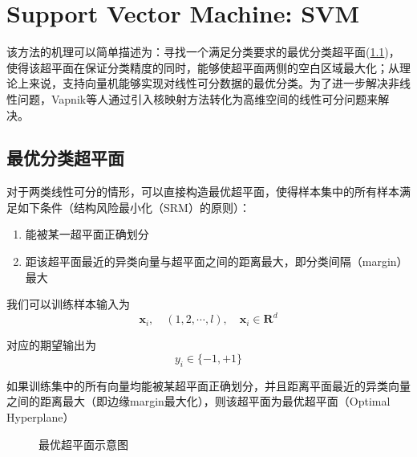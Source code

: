 \chapter{Support Vector Machine: SVM}

该方法的机理可以简单描述为：寻找一个满足分类要求的最优分类超平面(\ref{sec:optimal-classification-hyperplane})，使得该超平面在保证分类精度的同时，能够使超平面两侧的空白区域最大化；从理论上来说，支持向量机能够实现对线性可分数据的最优分类。为了进一步解决非线性问题，Vapnik等人通过引入核映射方法转化为高维空间的线性可分问题来解决。

\section{最优分类超平面}\label{sec:optimal-classification-hyperplane}

对于两类线性可分的情形，可以直接构造最优超平面，使得样本集中的所有样本满足如下条件（结构风险最小化（SRM）的原则）：
\begin{enumerate}
    \item 能被某一超平面正确划分
    \item 距该超平面最近的异类向量与超平面之间的距离最大，即分类间隔（margin）最大
\end{enumerate}

我们可以训练样本输入为
$$
    \mathbf{x}_i,\quad (1, 2, \cdots, l), \quad \mathbf{x}_i \in \mathbf{R}^d
$$

对应的期望输出为
$$
    y_i \in \{-1, +1\}
$$

如果训练集中的所有向量均能被某超平面正确划分，并且距离平面最近的异类向量之间的距离最大（即边缘margin最大化），则该超平面为最优超平面（Optimal Hyperplane）

\begin{figure}[ht]
    \centering
    
    \caption{最优超平面示意图}
    \label{fig:optimal-classification-hyperplane}
\end{figure}